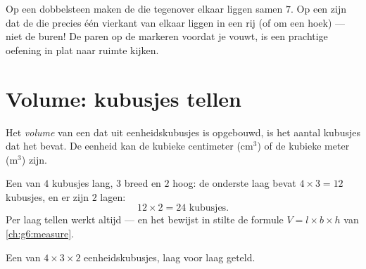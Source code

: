 \begin{example}\label{ex:g5:solids:read}
Op een dobbelsteen maken de  die tegenover elkaar liggen samen $7$.
Op een  zijn dat de  die precies één vierkant van elkaar
liggen in een rij (of om een hoek) --- niet de buren! De paren op de 
markeren voordat je vouwt, is een prachtige oefening in plat naar ruimte
kijken.
\end{example}

\section{Volume: kubusjes tellen}

\begin{definition}\label{def:g5:solids:volume}
Het \emph{volume} van een  dat uit eenheidskubusjes is
opgebouwd, is het aantal kubusjes dat het bevat. De eenheid kan de
kubieke centimeter (cm$^3$) of de kubieke meter (m$^3$) zijn.
\end{definition}

\begin{example}\label{ex:g5:solids:layers}
Een  van $4$ kubusjes lang, $3$ breed en $2$ hoog: de onderste laag bevat
$4 \times 3 = 12$ kubusjes, en er zijn $2$ lagen:
\[
12 \times 2 = 24 \text{ kubusjes} .
\]
Per laag tellen werkt altijd --- en het bewijst in stilte de formule
$V = l \times b \times h$ van \cref{ch:g6:measure}.
\end{example}

\begin{omfigure}

{\small Een  van $4 \times 3 \times 2$ eenheidskubusjes, laag voor laag
geteld.}
\end{omfigure}

